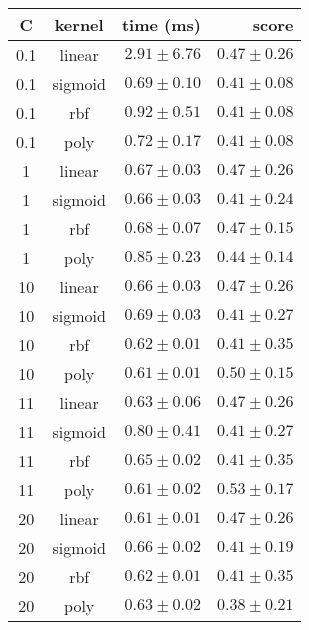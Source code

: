 \begin{tabular}{ccrr}
\toprule
\textbf{C} & \textbf{kernel} & \textbf{time (ms)} & \textbf{score}\\
\midrule
0.1 & linear & $2.91 \pm 6.76$ & $0.47 \pm 0.26$\\
0.1 & sigmoid & $0.69 \pm 0.10$ & $0.41 \pm 0.08$\\
0.1 & rbf & $0.92 \pm 0.51$ & $0.41 \pm 0.08$\\
0.1 & poly & $0.72 \pm 0.17$ & $0.41 \pm 0.08$\\
1 & linear & $0.67 \pm 0.03$ & $0.47 \pm 0.26$\\
1 & sigmoid & $0.66 \pm 0.03$ & $0.41 \pm 0.24$\\
1 & rbf & $0.68 \pm 0.07$ & $0.47 \pm 0.15$\\
1 & poly & $0.85 \pm 0.23$ & $0.44 \pm 0.14$\\
10 & linear & $0.66 \pm 0.03$ & $0.47 \pm 0.26$\\
10 & sigmoid & $0.69 \pm 0.03$ & $0.41 \pm 0.27$\\
10 & rbf & $0.62 \pm 0.01$ & $0.41 \pm 0.35$\\
10 & poly & $0.61 \pm 0.01$ & $0.50 \pm 0.15$\\
11 & linear & $0.63 \pm 0.06$ & $0.47 \pm 0.26$\\
11 & sigmoid & $0.80 \pm 0.41$ & $0.41 \pm 0.27$\\
11 & rbf & $0.65 \pm 0.02$ & $0.41 \pm 0.35$\\
11 & poly & $0.61 \pm 0.02$ & $0.53 \pm 0.17$\\
20 & linear & $0.61 \pm 0.01$ & $0.47 \pm 0.26$\\
20 & sigmoid & $0.66 \pm 0.02$ & $0.41 \pm 0.19$\\
20 & rbf & $0.62 \pm 0.01$ & $0.41 \pm 0.35$\\
20 & poly & $0.63 \pm 0.02$ & $0.38 \pm 0.21$\\
\bottomrule
\end{tabular}
